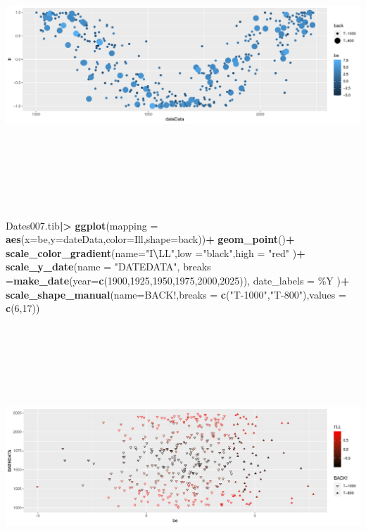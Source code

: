 \documentclass[
]{article}
\newenvironment{Shaded}{\begin{snugshade}}{\end{snugshade}}
\newcommand{\AttributeTok}[1]{\textcolor[rgb]{0.13,0.29,0.53}{#1}}
\newcommand{\DecValTok}[1]{\textcolor[rgb]{0.00,0.00,0.81}{#1}}
\newcommand{\FunctionTok}[1]{\textcolor[rgb]{0.13,0.29,0.53}{\textbf{#1}}}
\newcommand{\NormalTok}[1]{#1}
\newcommand{\SpecialCharTok}[1]{\textcolor[rgb]{0.81,0.36,0.00}{\textbf{#1}}}
\newcommand{\StringTok}[1]{\textcolor[rgb]{0.31,0.60,0.02}{#1}}
\begin{document}
\includegraphics[height=400]{3040_HW10_izd3_files/figure-latex/unnamed-chunk-4-1}

\begin{Shaded}
\begin{Highlighting}[]
\NormalTok{Dates007.tib}\SpecialCharTok{|\textgreater{}}
  \FunctionTok{ggplot}\NormalTok{(}\AttributeTok{mapping =} \FunctionTok{aes}\NormalTok{(}\AttributeTok{x=}\NormalTok{be,}\AttributeTok{y=}\NormalTok{dateData,}\AttributeTok{color=}\NormalTok{Ill,}\AttributeTok{shape=}\NormalTok{back))}\SpecialCharTok{+}
  \FunctionTok{geom\_point}\NormalTok{()}\SpecialCharTok{+}
  \FunctionTok{scale\_color\_gradient}\NormalTok{(}\AttributeTok{name=}\StringTok{"I}\SpecialCharTok{\textbackslash{}\textquotesingle{}}\StringTok{LL"}\NormalTok{,}\AttributeTok{low =}\StringTok{"black"}\NormalTok{,}\AttributeTok{high =} \StringTok{"red"}\NormalTok{ )}\SpecialCharTok{+}
  \FunctionTok{scale\_y\_date}\NormalTok{(}\AttributeTok{name =} \StringTok{"DATEDATA"}\NormalTok{,}
               \AttributeTok{breaks =}\FunctionTok{make\_date}\NormalTok{(}\AttributeTok{year=}\FunctionTok{c}\NormalTok{(}\DecValTok{1900}\NormalTok{,}\DecValTok{1925}\NormalTok{,}\DecValTok{1950}\NormalTok{,}\DecValTok{1975}\NormalTok{,}\DecValTok{2000}\NormalTok{,}\DecValTok{2025}\NormalTok{)),}
               \AttributeTok{date\_labels =} \StringTok{\textquotesingle{}\%Y\textquotesingle{}}\NormalTok{ )}\SpecialCharTok{+}
  \FunctionTok{scale\_shape\_manual}\NormalTok{(}\AttributeTok{name=}\StringTok{\textquotesingle{}BACK!\textquotesingle{}}\NormalTok{,}\AttributeTok{breaks =} \FunctionTok{c}\NormalTok{(}\StringTok{"T{-}1000"}\NormalTok{,}\StringTok{"T{-}800"}\NormalTok{),}\AttributeTok{values =} \FunctionTok{c}\NormalTok{(}\DecValTok{6}\NormalTok{,}\DecValTok{17}\NormalTok{))}
\end{Highlighting}
\end{Shaded}

\includegraphics[height=400]{3040_HW10_izd3_files/figure-latex/unnamed-chunk-4-2}
\end{document}
